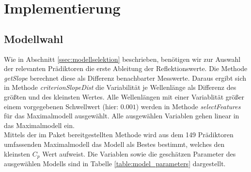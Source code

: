 \section{Implementierung}
\label{sec:implementation}
\subsection{Modellwahl}
\label{ssec:modelwahl}
Wie in Abschnitt \ref{ssec:modellselektion} beschrieben, benötigen wir zur Auswahl der relevanten Prädiktoren die erste Ableitung der Reflektionswerte. Die Methode \textit{getSlope} berechnet diese als Differenz benachbarter Messwerte. Daraus ergibt sich in Methode \textit{criterionSlopeDist} die Variabilität je Wellenlänge als Differenz des größten und des kleinsten Wertes. Alle Wellenlängen mit einer Variablität größer einem vorgegebenen Schwellwert (hier: $0.001$) werden in Methode \textit{selectFeatures} für das Maximalmodell ausgewählt. Alle ausgewählen Variablen gehen linear in das Maximalmodell ein.\\
Mittels der im Paket  bereitgestellten Methode  wird aus dem 149 Prädiktoren umfassenden Maximalmodell das Modell als Bestes bestimmt, welches den kleinsten $C_p$ Wert aufweist. Die Variablen sowie die geschätzen Parameter des ausgewählen Modells sind in Tabelle \ref{table:model_parameters} dargestellt.\\


